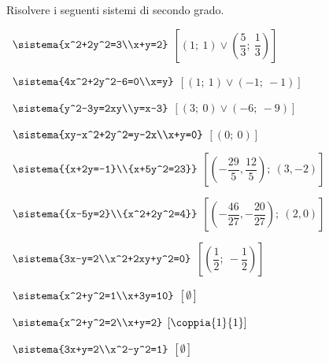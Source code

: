 \begin{esercizio}[*]
 \label{ese:6.1}
Risolvere i seguenti sistemi di secondo grado.
\begin{htmulticols}{2}
 \begin{enumeratea}
 \item~\(\sistema{x^2+2y^2=3\\x+y=2}\)
\hfill\(\left[\left(1;~1\right) \vee 
        \left(\dfrac 5 3;~\dfrac{1}{3}\right)\right]\)
 \item~\(\sistema{4x^2+2y^2-6=0\\x=y}\)
\hfill\(\left[\left(1;~1\right)\vee \left(-1;~-1\right)\right]\)
 \item~\(\sistema{y^2-3y=2xy\\y=x-3}\)
\hfill\(\left[\left(3;~0\right)\vee \left(-6;~-9\right)\right]\)
 \item~\(\sistema{xy-x^2+2y^2=y-2x\\x+y=0}\)
\hfill\(\left[\left(0;~0\right)\right]\)
 \item~\(\sistema{{x+2y=-1}\\{x+5y^2=23}}\)
\hfill\(\left[\left(-\dfrac{29} 5,\dfrac{12} 5\right);~   
              (3,-2)\right]\)
 \item~\(\sistema{{x-5y=2}\\{x^2+2y^2=4}}\)
\hfill\(\left[\left(-\dfrac{46}{27},-\dfrac{20}{27}\right);~
(2,0)\right]\)
 \item~\(\sistema{3x-y=2\\x^2+2xy+y^2=0}\)
\hfill\(\left[\left(\dfrac 1 2;~-\dfrac 1 2\right)\right]\)
 \item~\(\sistema{x^2+y^2=1\\x+3y=10}\)
\hfill\(\left[\emptyset\right]\)
 \item~\(\sistema{x^2+y^2=2\\x+y=2}\)
\hfill\(\left[\coppia{1}{1}\right]\)
 \item~\(\sistema{3x+y=2\\x^2-y^2=1}\)
\hfill\(\left[\emptyset\right]\)
 \end{enumeratea}
 \end{htmulticols}
\end{esercizio}


